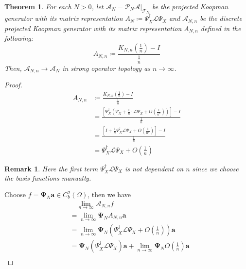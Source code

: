 \documentclass{article}[11]
\newtheorem{theorem}{Theorem}
\newtheorem*{remark}{Remark}
\begin{document}
	\begin{theorem}
		For each $N>0$, let $\mathcal{A}_N = \mathcal{P}_N \mathcal{A}|_{\mathcal{F}_N}$ be the projected Koopman generator with its matrix representation $A_N \coloneqq \Psi_X^{\dagger}\mathcal{L}\Psi_X$ and $\mathcal{A}_{N,n}$ be the discrete projected Koopman generator with its matrix representation $A_{N,n}$ defined in the following: 
		\begin{equation*}
			A_{N,n} \coloneqq \frac{ K_{N,n}\left( \tfrac{1}{n} \right)  - I }{\tfrac{1}{n}}
		\end{equation*}
		Then, $\mathcal{A}_{N,n} \to \mathcal{A}_N$ in strong operator topology as $n\to\infty$.
	\end{theorem}
	\begin{proof}
		\begin{align*}
			A_{N,n} &\coloneqq \frac{ K_{N,n}\left( \tfrac{1}{n} \right)  - I }{\tfrac{1}{n}} \\
			&= \frac{ \left[\Psi_X^{\dagger}\left(\Psi_X + \tfrac{1}{n} \cdot \mathcal{L}\Psi_X + O(\tfrac{1}{n^2})\right)\right]  - I }{\tfrac{1}{n}} \\
			&= \frac{ \left[I + \tfrac{1}{n}\Psi_X^{\dagger}\mathcal{L}\Psi_X + O(\tfrac{1}{n^2})\right]  - I }{\tfrac{1}{n}} \\
			&= \Psi_X^{\dagger}\mathcal{L}\Psi_X + O(\tfrac{1}{n})
		\end{align*}
		\begin{remark}
			Here the first term $\Psi_X^{\dagger}\mathcal{L}\Psi_X$ is not dependent on $n$ since we choose the basis functions manually.
		\end{remark}
		Choose $f = \mathbf{\Psi}_N\mathbf{a} \in C_b^2(\Omega)$, then we have
		\begin{align*}
			&\quad \lim_{n\to\infty} \mathcal{A}_{N,n}f \\
			&= \lim_{n\to\infty} \mathbf{\Psi}_N A_{N,n}\mathbf{a} \\
			&= \lim_{n\to\infty} \mathbf{\Psi}_N\left(\Psi_X^{\dagger}\mathcal{L}\Psi_X + O(\tfrac{1}{n})\right)\mathbf{a} \\
			&= \mathbf{\Psi}_N\left(\Psi_X^{\dagger}\mathcal{L}\Psi_X\right)\mathbf{a} + \lim_{n\to\infty} \mathbf{\Psi}_N O(\tfrac{1}{n})\mathbf{a} \\

\end{align*}
\end{proof}
\end{document}
